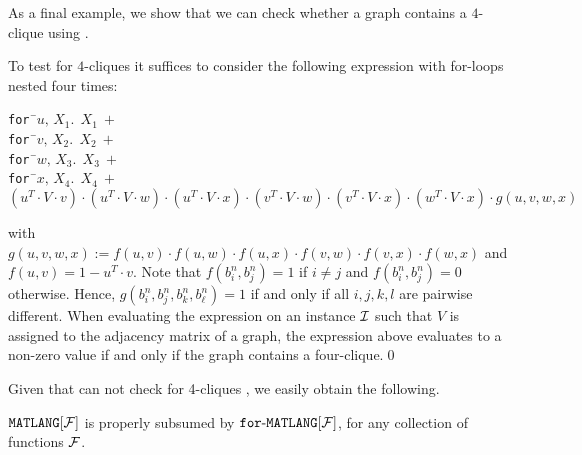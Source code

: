 As a final example, we show that we can check whether a graph contains a $4$-clique using \langfor.
\begin{example}\label{ex:fourcliques}
To test for $4$-cliques it suffices to consider the following expression with for-loops nested four times:
\begin{center}
\parbox{0cm}{
\begin{tabbing}
\texttt{for\,}\=$u,\,X_1.\ \ X_1 \ + $\\
\> \texttt{for\,}\=$v,\,X_2.\ \ X_2 \ +$ \\
\>\>\texttt{for\,}\=$w,\,X_3.\ \ X_3 \ +$ \\
\>\>\>\texttt{for\,}\=$x,\,X_4.\ \ X_4 \ +$ \\
\>\>\>\>$(u^T\!\cdot\! V\!\cdot\! v) \!\cdot\! (u^T\!\cdot\! V\!\cdot\! w)\!\cdot\! (u^T\!\cdot\! V\!\cdot\! x) \!\cdot\! (v^T\!\cdot\! V\!\cdot\! w) \!\cdot\! (v^T\!\cdot\! V\!\cdot\! x)\!\cdot\! (w^T\!\cdot\! V\!\cdot\! x) \!\cdot\! g(u,v,w,x)$
\end{tabbing}
}
\end{center}
with $g(u,v,w,x):=f(u,v)\cdot f(u,w)\cdot f(u,x)\cdot f(v,w)\cdot f(v,x)\cdot f(w,x)$ and
$f(u,v)=1-u^T\cdot v$. Note that $f(b_i^n,b_j^n)=1$ if $i\neq j$ and $f(b_i^n,b_j^n)=0$ otherwise.
Hence, $g(b_i^n,b_j^n,b_k^n,b_\ell^n)=1$ if and only if all $i,j,k,l$ are pairwise different.
When evaluating the expression on an instance $\mathcal{I}$ such that $V$ is assigned to the adjacency 
matrix of a graph, the expression above evaluates to a non-zero value if and only if the graph
contains a four-clique.\qed
\end{example}

Given that \lang can not check for 4-cliques \cite{matlang-journal}, we easily obtain the following.

\begin{proposition}
\label{cor-ml-fml}
$\texttt{MATLANG}[\mathcal{F}]$ is properly subsumed by $\texttt{for}\text{-}\texttt{MATLANG}[\mathcal{F}]$, for any collection of functions $\mathcal{F}$.
\end{proposition} 

